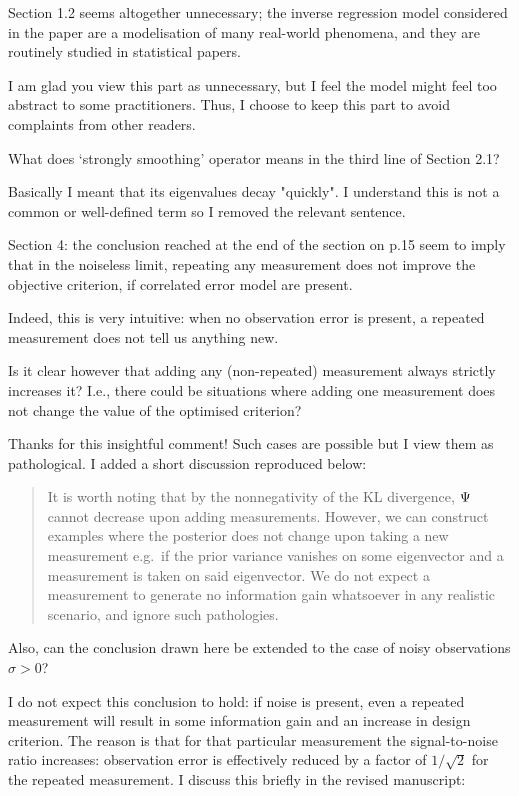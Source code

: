   
\RC Section 1.2 seems altogether unnecessary; the inverse regression
model considered in the paper are a modelisation of many real-world
phenomena, and they are routinely studied in statistical papers.

\AR I am glad you view this part as unnecessary, but I feel the model
might feel too abstract to some practitioners. Thus, I choose to keep
this part to avoid complaints from other readers.

\RC What does ‘strongly smoothing’ operator means in the third line of Section 2.1?

\AR Basically I meant that its eigenvalues decay "quickly". I
understand this is not a common or well-defined term so I removed the
relevant sentence.

  
\RC Section 4: the conclusion reached at the end of the section on
p.15 seem to imply that in the noiseless limit, repeating any
measurement does not improve the objective criterion, if correlated
error model are present.

\AR Indeed, this is very intuitive: when no observation error is
present, a repeated measurement does not tell us anything new.


\RC Is it clear however that adding any (non-repeated) measurement
always strictly increases it? I.e., there could be situations where
adding one measurement does not change the value of the optimised
criterion?

\AR Thanks for this insightful comment! Such cases are possible but I
view them as pathological. I added a short discussion reproduced
below:

\begin{quote}%
It is worth noting that by the nonnegativity of the KL divergence,
$\Psi$ cannot decrease upon adding measurements. However, we can
construct examples where the posterior does not change upon taking a
new measurement e.g.~if the prior variance vanishes on some
eigenvector and a measurement is taken on said eigenvector. We do not
expect a measurement to generate no information gain whatsoever in any
realistic scenario, and ignore such pathologies.
\end{quote}

\RC Also, can the conclusion drawn here be extended to the case of
noisy observations $\sigma > 0$?

\AR I do not expect this conclusion to hold: if noise is present, even
a repeated measurement will result in some information gain and an
increase in design criterion. The reason is that for that particular
measurement the signal-to-noise ratio increases: observation error is
effectively reduced by a factor of $1/\sqrt{2}$ for the repeated
measurement. I discuss this briefly in the revised manuscript:
 
